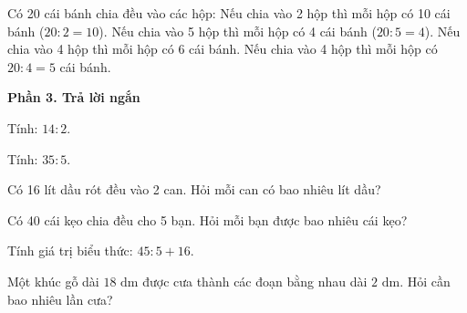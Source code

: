 \begin{ex} %
Có 20 cái bánh chia đều vào các hộp:
\choiceTF
{\True Nếu chia vào 2 hộp thì mỗi hộp có 10 cái bánh ($20 : 2 = 10$).}
{\True Nếu chia vào 5 hộp thì mỗi hộp có 4 cái bánh ($20 : 5 = 4$).}
{Nếu chia vào 4 hộp thì mỗi hộp có 6 cái bánh.}
{\True Nếu chia vào 4 hộp thì mỗi hộp có $20 : 4 = 5$ cái bánh.}
\end{ex}

\textbf{Phần 3. Trả lời ngắn}

\begin{ex} %
Tính: $14 : 2$.
\end{ex}

\begin{ex} %
Tính: $35 : 5$.
\end{ex}

\begin{ex} %
Có 16 lít dầu rót đều vào 2 can. Hỏi mỗi can có bao nhiêu lít dầu?
\end{ex}

\begin{ex} %
Có 40 cái kẹo chia đều cho 5 bạn. Hỏi mỗi bạn được bao nhiêu cái kẹo?
\end{ex}

\begin{ex} %
Tính giá trị biểu thức: $45 : 5 + 16$.
\end{ex}

\begin{ex} %
Một khúc gỗ dài $18\text{ dm}$ được cưa thành các đoạn bằng nhau dài $2\text{ dm}$. Hỏi cần bao nhiêu lần cưa?
\end{ex}
